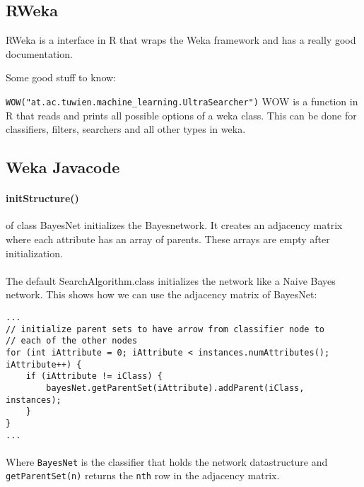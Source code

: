 \documentclass[paper=a4, fontsize=11pt]{scrartcl} %
\numberwithin{equation}{section} %
\numberwithin{figure}{section} %
\numberwithin{table}{section} %
\begin{document}
\subsection{RWeka}

RWeka is a interface in R that wraps the Weka framework and has a really good documentation.

Some good stuff to know:

\texttt{WOW("at.ac.tuwien.machine\_learning.UltraSearcher")} WOW is a function in R that reads and prints all possible options of a weka class. This can be done for classifiers, filters, searchers and all other types in weka.

\subsection{Weka Javacode}

\paragraph{initStructure()} of class BayesNet initializes the Bayesnetwork. It creates an adjacency matrix where each attribute has an array of parents. These arrays are empty after initialization.

\paragraph{} The default SearchAlgorithm.class initializes the network like a Naive Bayes network. This shows how we can use the adjacency matrix of BayesNet:

\begin{lstlisting}
...
// initialize parent sets to have arrow from classifier node to
// each of the other nodes
for (int iAttribute = 0; iAttribute < instances.numAttributes(); iAttribute++) {
    if (iAttribute != iClass) {
        bayesNet.getParentSet(iAttribute).addParent(iClass, instances);
    }
}
...
\end{lstlisting}

\paragraph{} Where \texttt{BayesNet} is the classifier that holds the network datastructure and \texttt{getParentSet(n)} returns the \texttt{nth} row in the adjacency matrix.










\end{document}
